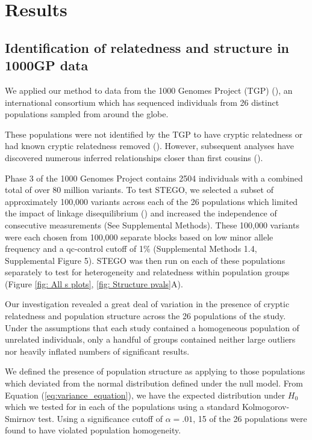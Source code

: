 \section{Results}

\subsection{Identification of relatedness and structure in 1000GP data}

We applied our method to data from the 1000 Genomes Project (TGP)
(\citealp{10002012integrated,10002015global}), an international consortium
which has sequenced individuals from 26 distinct populations sampled
from around the globe.

These populations were not identified by the TGP to have cryptic relatedness
or had known cryptic relatedness removed (\citealp{1000GPcrypticppt}).
However, subsequent analyses have discovered numerous inferred relationships
closer than first cousins (\citealp{gazal2015high,al2015inference,fedorova2016atlas}).

Phase 3 of the 1000 Genomes Project contains 2504 individuals with
a combined total of over 80 million variants. To test STEGO, we selected
a subset of approximately 100,000 variants across each of the 26 populations
which limited the impact of linkage disequilibrium (\citealp{price2008long})
and increased the independence of consecutive measurements (See Supplemental
Methods).  These 100,000 variants were each chosen from 100,000 separate blocks based on low minor allele frequency and a qc-control cutoff of 1\% (Supplemental Methods 1.4, Supplemental Figure 5). STEGO was then run on each of these populations separately
to test for heterogeneity and relatedness within population groups (Figure \ref{fig: All s plots}, \ref{fig: Structure pvals}A).

Our investigation revealed a great deal of variation in the presence
of cryptic relatedness and population structure across the 26 populations
of the study. Under the assumptions that each study contained a homogeneous
population of unrelated individuals, only a handful of groups contained
neither large outliers nor heavily inflated numbers of significant
results.

We defined the presence of population structure as applying to those
populations which deviated from the normal distribution defined under
the null model. From Equation (\ref{eq:variance_equation}), we have
the expected distribution under $H_{0}$ which we tested for in each
of the populations using a standard Kolmogorov-Smirnov test. Using
a significance cutoff of $\alpha=.01$, 15 of the 26 populations were
found to have violated population homogeneity. 

